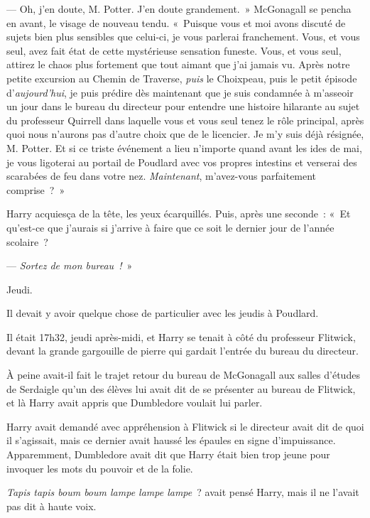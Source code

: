 --- Oh, j'en doute, M. Potter.
J'en doute grandement.~»
McGonagall se pencha en avant, le visage de nouveau tendu.
«~Puisque vous et moi avons discuté de sujets bien plus sensibles que celui-ci, je vous parlerai franchement.
Vous, et vous seul, avez fait état de cette mystérieuse sensation funeste.
Vous, et vous seul, attirez le chaos plus fortement que tout aimant que j'ai jamais vu.
Après notre petite excursion au Chemin de Traverse, \emph{puis} le Choixpeau, puis le petit épisode d'\emph{aujourd'hui}, je puis prédire dès maintenant que je suis condamnée à m'asseoir un jour dans le bureau du directeur pour entendre une histoire hilarante au sujet du professeur Quirrell dans laquelle vous et vous seul tenez le rôle principal, après quoi nous n'aurons pas d'autre choix que de le licencier.
Je m'y suis déjà résignée, M. Potter.
Et si ce triste événement a lieu n'importe quand avant les ides de mai, je vous ligoterai au portail de Poudlard avec vos propres intestins et verserai des scarabées de feu dans votre nez.
\emph{Maintenant}, m'avez-vous parfaitement comprise~?~»

Harry acquiesça de la tête, les yeux écarquillés.
Puis, après une seconde~:
«~Et qu'est-ce que j'aurais si j'arrive à faire que ce soit le dernier jour de l'année scolaire~?

--- \emph{Sortez de mon bureau~!}~»

\later

Jeudi.

Il devait y avoir quelque chose de particulier avec les jeudis à Poudlard.

Il était 17h32, jeudi après-midi, et Harry se tenait à côté du professeur Flitwick, devant la grande gargouille de pierre qui gardait l'entrée du bureau du directeur.

À peine avait-il fait le trajet retour du bureau de McGonagall aux salles d'études de Serdaigle qu'un des élèves lui avait dit de se présenter au bureau de Flitwick, et là Harry avait appris que Dumbledore voulait lui parler.

Harry avait demandé avec appréhension à Flitwick si le directeur avait dit de quoi il s'agissait, mais ce dernier avait haussé les épaules en signe d'impuissance.
Apparemment, Dumbledore avait dit que Harry était bien trop jeune pour invoquer les mots du pouvoir et de la folie.

\emph{Tapis tapis boum boum lampe lampe lampe}~? avait pensé Harry, mais il ne l'avait pas dit à haute voix.

